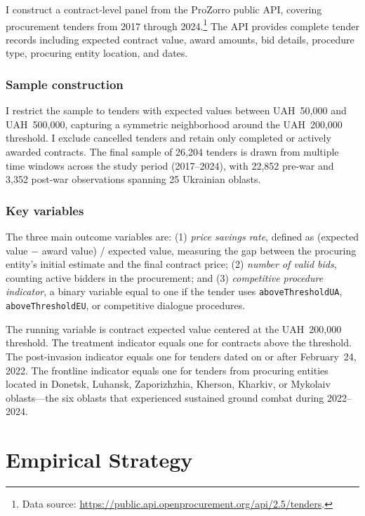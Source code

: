 \documentclass[12pt]{article}
\begin{document}
I construct a contract-level panel from the ProZorro public API, covering procurement tenders from 2017 through 2024.\footnote{Data source: \url{https://public.api.openprocurement.org/api/2.5/tenders}.} The API provides complete tender records including expected contract value, award amounts, bid details, procedure type, procuring entity location, and dates.

\subsubsection*{Sample construction} I restrict the sample to tenders with expected values between UAH~50,000 and UAH~500,000, capturing a symmetric neighborhood around the UAH~200,000 threshold. I exclude cancelled tenders and retain only completed or actively awarded contracts. The final sample of 26,204 tenders is drawn from multiple time windows across the study period (2017--2024), with 22,852 pre-war and 3,352 post-war observations spanning 25 Ukrainian oblasts.

\subsubsection*{Key variables} The three main outcome variables are: (1) \textit{price savings rate}, defined as (expected value $-$ award value) / expected value, measuring the gap between the procuring entity's initial estimate and the final contract price; (2) \textit{number of valid bids}, counting active bidders in the procurement; and (3) \textit{competitive procedure indicator}, a binary variable equal to one if the tender uses \texttt{aboveThresholdUA}, \texttt{aboveThresholdEU}, or competitive dialogue procedures.

The running variable is contract expected value centered at the UAH~200,000 threshold. The treatment indicator equals one for contracts above the threshold. The post-invasion indicator equals one for tenders dated on or after February~24, 2022. The frontline indicator equals one for tenders from procuring entities located in Donetsk, Luhansk, Zaporizhzhia, Kherson, Kharkiv, or Mykolaiv oblasts---the six oblasts that experienced sustained ground combat during 2022--2024.




\section{Empirical Strategy}
\end{document}
